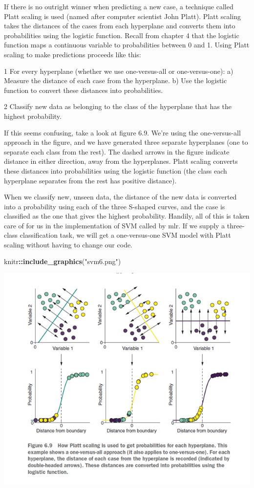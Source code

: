 \documentclass[
]{article}
\newenvironment{Shaded}{\begin{snugshade}}{\end{snugshade}}
\newcommand{\FunctionTok}[1]{\textcolor[rgb]{0.13,0.29,0.53}{\textbf{#1}}}
\newcommand{\NormalTok}[1]{#1}
\newcommand{\SpecialCharTok}[1]{\textcolor[rgb]{0.81,0.36,0.00}{\textbf{#1}}}
\newcommand{\StringTok}[1]{\textcolor[rgb]{0.31,0.60,0.02}{#1}}
\begin{document}
If there is no outright winner when predicting a new case, a technique
called Platt scaling is used (named after computer scientist John
Platt). Platt scaling takes the distances of the cases from each
hyperplane and converts them into probabilities using the logistic
function. Recall from chapter 4 that the logistic function maps a
continuous variable to probabilities between 0 and 1. Using Platt
scaling to make predictions proceeds like this:

1 For every hyperplane (whether we use one-versus-all or
one-versus-one): a) Measure the distance of each case from the
hyperplane. b) Use the logistic function to convert these distances into
probabilities.

2 Classify new data as belonging to the class of the hyperplane that has
the highest probability.

If this seems confusing, take a look at figure 6.9. We're using the
one-versus-all approach in the figure, and we have generated three
separate hyperplanes (one to separate each class from the rest). The
dashed arrows in the figure indicate distance in either direction, away
from the hyperplanes. Platt scaling converts these distances into
probabilities using the logistic function (the class each hyperplane
separates from the rest has positive distance).

When we classify new, unseen data, the distance of the new data is
converted into a probability using each of the three S-shaped curves,
and the case is classified as the one that gives the highest
probability. Handily, all of this is taken care of for us in the
implementation of SVM called by mlr. If we supply a three-class
classification task, we will get a one-versus-one SVM model with Platt
scaling without having to change our code.

\begin{Shaded}
\begin{Highlighting}[]
\NormalTok{knitr}\SpecialCharTok{::}\FunctionTok{include\_graphics}\NormalTok{(}\StringTok{"svm6.png"}\NormalTok{)}
\end{Highlighting}
\end{Shaded}

\includegraphics[width=8.67in]{svm6}
\end{document}
